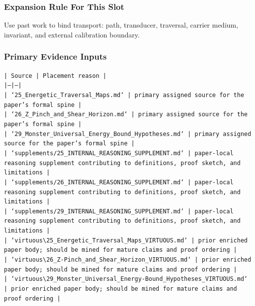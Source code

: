 \documentclass[11pt]{article}
\begin{document}
\subsubsection*{Expansion Rule For This Slot}

Use past work to bind transport: path, transducer, traversal, carrier medium, invariant, and external calibration boundary.

\subsubsection*{Primary Evidence Inputs}

\noindent\texttt{| Source | Placement reason |}\\
\noindent\texttt{|---|---|}\\
\noindent\texttt{| `25\_Energetic\_Traversal\_Maps.md` | primary assigned source for the paper's formal spine |}\\
\noindent\texttt{| `26\_Z\_Pinch\_and\_Shear\_Horizon.md` | primary assigned source for the paper's formal spine |}\\
\noindent\texttt{| `29\_Monster\_Universal\_Energy\_Bound\_Hypotheses.md` | primary assigned source for the paper's formal spine |}\\
\noindent\texttt{| `supplements/25\_INTERNAL\_REASONING\_SUPPLEMENT.md` | paper-local reasoning supplement contributing to definitions, proof sketch, and limitations |}\\
\noindent\texttt{| `supplements/26\_INTERNAL\_REASONING\_SUPPLEMENT.md` | paper-local reasoning supplement contributing to definitions, proof sketch, and limitations |}\\
\noindent\texttt{| `supplements/29\_INTERNAL\_REASONING\_SUPPLEMENT.md` | paper-local reasoning supplement contributing to definitions, proof sketch, and limitations |}\\
\noindent\texttt{| `virtuous\textbackslash{}25\_Energetic\_Traversal\_Maps\_VIRTUOUS.md` | prior enriched paper body; should be mined for mature claims and proof ordering |}\\
\noindent\texttt{| `virtuous\textbackslash{}26\_Z-Pinch\_and\_Shear\_Horizon\_VIRTUOUS.md` | prior enriched paper body; should be mined for mature claims and proof ordering |}\\
\noindent\texttt{| `virtuous\textbackslash{}29\_Monster\_Universal\_Energy-Bound\_Hypotheses\_VIRTUOUS.md` | prior enriched paper body; should be mined for mature claims and proof ordering |}\\
\end{document}
